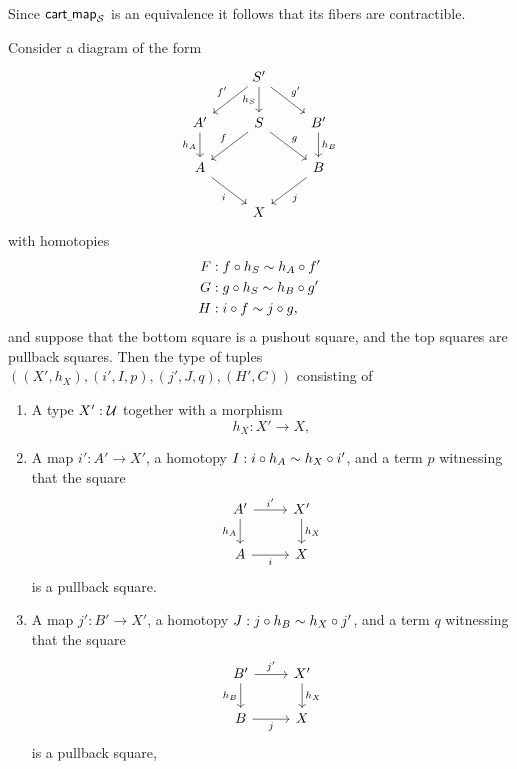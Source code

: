 Since $\mathsf{cart\underline{\ }{}map}_{\mathcal{S}}$ is an equivalence it follows that its fibers are contractible. 

\begin{cor}\label{cor:descent_fib}
Consider a diagram of the form 
\begin{equation*}
\begin{tikzcd}
& S' \arrow[d,swap,"h_S"] \arrow[dl,swap,"{f'}"] \arrow[dr,"{g'}"] \\
A' \arrow[d,swap,"h_A"] & S \arrow[dl,swap,"f"] \arrow[dr,"g"] & B' \arrow[d,"{h_B}"] \\
A \arrow[dr,swap,"i"] & & B \arrow[dl,"j"] \\
& X
\end{tikzcd}
\end{equation*}
with homotopies
\begin{align*}
F & : f\circ h_S \sim h_A\circ f' \\
G & : g\circ h_S \sim h_B\circ g' \\
H & : i\circ f \sim j\circ g,
\end{align*}
and suppose that the bottom square is a pushout square, and the top squares are pullback squares.
Then the type of tuples $((X',h_X),(i',I,p),(j',J,q),(H',C))$ consisting of
\begin{enumerate}
\item A type $X':\mathcal{U}$ together with a morphism
\begin{equation*}
h_X : X'\to X,
\end{equation*}
\item A map $i':A'\to X'$, a homotopy $I:i\circ h_A\sim h_X\circ i'$, and a term $p$ witnessing that the square
\begin{equation*}
\begin{tikzcd}
A' \arrow[d,swap,"h_A"] \arrow[r,"{i'}"] & X' \arrow[d,"h_X"] \\
A \arrow[r,swap,"i"] & X
\end{tikzcd}
\end{equation*}
is a pullback square.
\item A map $j':B'\to X'$, a homotopy $J:j\circ h_B\sim h_X\circ j'$, and a term $q$ witnessing that the square
\begin{equation*}
\begin{tikzcd}
B' \arrow[d,swap,"h_B"] \arrow[r,"{j'}"] & X' \arrow[d,"h_X"] \\
B \arrow[r,swap,"j"] & X
\end{tikzcd}
\end{equation*}
is a pullback square,

\end{enumerate}
\end{cor}
